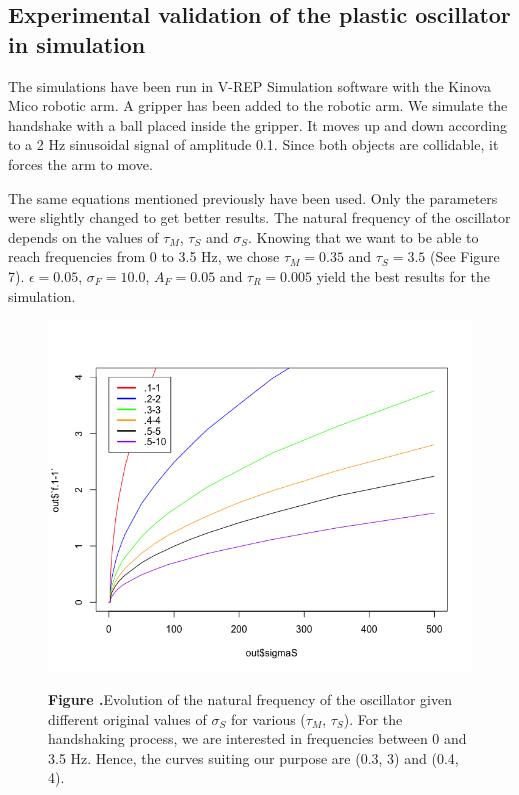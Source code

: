 \documentclass{report}
\begin{document}
\subsection{Experimental validation of the plastic oscillator in simulation}

The simulations have been run in V-REP Simulation software with the Kinova Mico robotic arm. A gripper has been added to the robotic arm. We simulate the handshake with a ball placed inside the gripper. It moves up and down according to a 2 Hz sinusoidal signal of amplitude 0.1. Since both objects are collidable, it forces the arm to move.

The same equations mentioned previously have been used. Only the parameters were slightly changed to get better results.
The natural frequency of the oscillator depends on the values of $\tau_M$, $\tau_S$ and $\sigma_S$. Knowing that we want to be able to reach frequencies from 0 to 3.5 Hz, we chose $\tau_M = 0.35$ and $\tau_S = 3.5$ (See Figure 7). 
$\epsilon = 0.05$, $\sigma_F = 10.0$, $A_F = 0.05$ and $\tau_R = 0.005$ yield the best results for the simulation. 

\begin{figure}[h!]
\begin{center}
\includegraphics[width=15cm]{figures/f_ss2.png}
\end{center}
 \textbf{\label{fig:05} Figure .}{Evolution of the natural frequency of the oscillator given different original values of $\sigma_S$ for various ($\tau_M$, $\tau_S$). For the handshaking process, we are interested in frequencies between 0 and 3.5 Hz. Hence, the curves suiting our purpose are (0.3, 3) and (0.4, 4).}
\end{figure}
\end{document}

